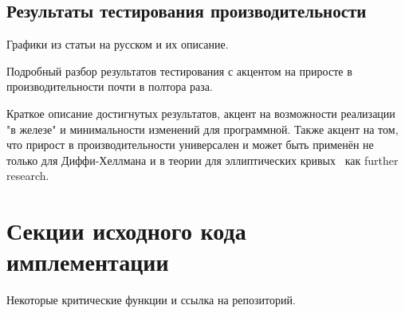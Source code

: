 \documentclass[times,specification,annotation]{itmo-student-thesis}
\begin{document}
\section{Результаты тестирования производительности}\label{sec:results}

Графики из статьи на русском и их описание.

\chapterconclusion

Подробный разбор результатов тестирования с акцентом на приросте в производительности почти в полтора раза.

\startconclusionpage

Краткое описание достигнутых результатов, акцент на возможности реализации "в железе"
и минимальности изменений для программной.
Также акцент на том, что прирост в производительности универсален и может быть применён не только для Диффи-Хеллмана
и в теории для эллиптических кривых~\cite{sta03} как further research.

\printmainbibliography


\appendix

\chapter{Секции исходного кода имплементации}\label{sec:app:1}

    Некоторые критические функции и ссылка на репозиторий.
\end{document}
